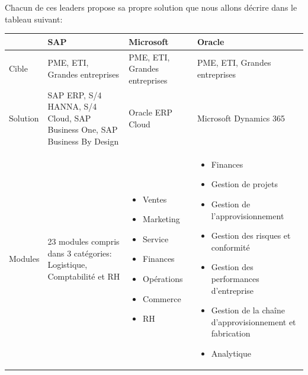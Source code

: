     Chacun de ces leaders propose sa propre solution que nous allons décrire dans le tableau suivant:

    \begin{table}[H]
        \begin{center}
            
            \begin{tabular}{|F{2.3cm}|R{3.5cm}|R{3.5cm}|R{3.5cm}|}
                \hline
                \textbf{ } & SAP & Microsoft & Oracle \\
                \hline
                Cible & \acs{PME}, \acs{ETI}, Grandes entreprises & \acs{PME}, \acs{ETI}, Grandes entreprises & \acs{PME}, \acs{ETI}, Grandes entreprises\\
                
                \hline
                Solution & SAP ERP, S/4 HANNA, S/4 Cloud, SAP Business One, SAP Business By Design & Oracle \acs{ERP} Cloud & Microsoft Dynamics 365\\
                
                \hline
                Modules
                &
                23 modules compris dans  3 catégories: Logistique, Comptabilité et RH
                &
                \begin{itemize}
                    \item Ventes
                    \item Marketing
                    \item Service
                    \item Finances
                    \item Opérations
                    \item Commerce
                    \item RH
                \end{itemize}
                &
                \begin{itemize}
                    \item Finances
                    \item Gestion de projets
                    \item Gestion de l'approvisionnement
                    \item Gestion des risques et conformité
                    \item Gestion des performances d'entreprise
                    \item Gestion de la chaîne d'approvisionnement et fabrication
                    \item Analytique 
                \end{itemize}
                \\


\end{tabular}
\end{center}
\end{table}
